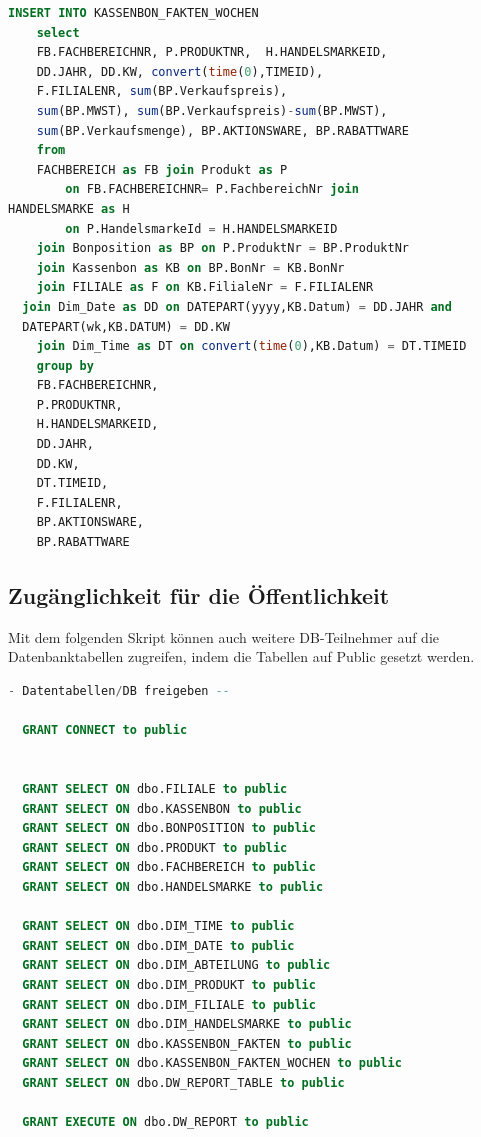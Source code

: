 \begin{lstlisting}[language=SQL]
  INSERT INTO KASSENBON_FAKTEN_WOCHEN
	select
	FB.FACHBEREICHNR, P.PRODUKTNR,	H.HANDELSMARKEID,
	DD.JAHR, DD.KW, convert(time(0),TIMEID),
	F.FILIALENR, sum(BP.Verkaufspreis),
	sum(BP.MWST), sum(BP.Verkaufspreis)-sum(BP.MWST),
	sum(BP.Verkaufsmenge), BP.AKTIONSWARE, BP.RABATTWARE
	from
	FACHBEREICH as FB join Produkt as P
		on FB.FACHBEREICHNR= P.FachbereichNr join
HANDELSMARKE as H
		on P.HandelsmarkeId = H.HANDELSMARKEID
	join Bonposition as BP on P.ProduktNr = BP.ProduktNr
	join Kassenbon as KB on BP.BonNr = KB.BonNr
	join FILIALE as F on KB.FilialeNr = F.FILIALENR
  join Dim_Date as DD on DATEPART(yyyy,KB.Datum) = DD.JAHR and
  DATEPART(wk,KB.DATUM) = DD.KW
	join Dim_Time as DT on convert(time(0),KB.Datum) = DT.TIMEID
	group by
	FB.FACHBEREICHNR,
	P.PRODUKTNR,
	H.HANDELSMARKEID,
	DD.JAHR,
	DD.KW,
    DT.TIMEID,
	F.FILIALENR,
	BP.AKTIONSWARE,
	BP.RABATTWARE
\end{lstlisting}

\subsection{Zugänglichkeit für die Öffentlichkeit}

Mit dem folgenden Skript können auch weitere DB-Teilnehmer auf die Datenbanktabellen zugreifen, indem die Tabellen auf Public gesetzt werden.

\begin{lstlisting}[language=SQL]
  - Datentabellen/DB freigeben --

  GRANT CONNECT to public


  GRANT SELECT ON dbo.FILIALE to public
  GRANT SELECT ON dbo.KASSENBON to public
  GRANT SELECT ON dbo.BONPOSITION to public
  GRANT SELECT ON dbo.PRODUKT to public
  GRANT SELECT ON dbo.FACHBEREICH to public
  GRANT SELECT ON dbo.HANDELSMARKE to public

  GRANT SELECT ON dbo.DIM_TIME to public
  GRANT SELECT ON dbo.DIM_DATE to public
  GRANT SELECT ON dbo.DIM_ABTEILUNG to public
  GRANT SELECT ON dbo.DIM_PRODUKT to public
  GRANT SELECT ON dbo.DIM_FILIALE to public
  GRANT SELECT ON dbo.DIM_HANDELSMARKE to public
  GRANT SELECT ON dbo.KASSENBON_FAKTEN to public
  GRANT SELECT ON dbo.KASSENBON_FAKTEN_WOCHEN to public
  GRANT SELECT ON dbo.DW_REPORT_TABLE to public

  GRANT EXECUTE ON dbo.DW_REPORT to public
\end{lstlisting}


